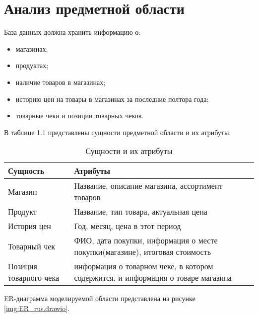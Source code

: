 \documentclass[a4paper]{bmstu}
\begin{document}
\section{Анализ предметной области}

База данных должна хранить информацию о:

\begin{itemize}
	\item магазинах;
	\item продуктах;
	\item наличие товаров в магазинах;
	\item историю цен на товары в магазинах за последние полтора года;
	\item товарные чеки и позиции товарных чеков.
\end{itemize}

В таблице 1.1 представлены сущности предметной области и их атрибуты.

\begin{table}[H]
	\caption{Сущности и их атрибуты}
	\begin{center}
		\begin{tabular}{| l | p{10 cm} |} 
			\hline
			
			\textbf{Сущность} & \textbf{Атрибуты} \\  
			
			\hline
			
			Магазин & Название, описание магазина, ассортимент товаров \\
			
			\hline
			
			Продукт & Название, тип товара, актуальная цена \\
			
			\hline
			
			История цен & Год, месяц, цена в этот период \\
			
			\hline
			
			Товарный чек & ФИО, дата покупки, информация о месте покупки(магазине), итоговая стоимость \\
			\hline
			
			Позиция товарного чека & информация о товарном чеке, в котором содержится, и информация о товаре магазина \\
			\hline
		\end{tabular}
	\end{center}
\end{table}

ER-диаграмма моделируемой области представлена на рисунке \ref{img:ER_rus.drawio}.
\end{document}

